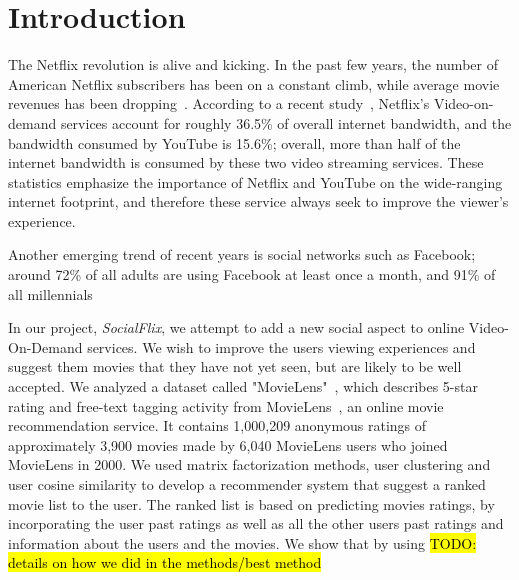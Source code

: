 \section{Introduction}
\label{sec:intro}

The Netflix revolution is alive and kicking. 
In the past few years, the number of American Netflix subscribers has been on a constant climb, while average movie revenues has been dropping~\cite{MisixNetflix}.
According to a recent study~\cite{VarietyNetflixBandwidth}, Netflix's Video-on-demand services account for roughly 36.5\% of overall internet bandwidth, and the bandwidth consumed by YouTube is 15.6\%; overall, more than half of the internet bandwidth is consumed by these two video streaming services.
These statistics emphasize the importance of Netflix and YouTube on the wide-ranging internet footprint, and therefore these service always seek to improve the viewer's experience.

Another emerging trend of recent years is social networks such as Facebook; around 72\% of all adults are using Facebook at least once a month, and 91\% of all millennials~\cite{FacebookStats}

In our project, \textit{SocialFlix}, we attempt to add a new social aspect to online Video-On-Demand services. We wish to improve the users viewing experiences and suggest them movies that they have not yet seen, but are likely to be well accepted. We analyzed a dataset called "MovieLens"~\cite{GroupLens}, which describes 5-star rating and free-text tagging activity from MovieLens~\cite{MovieLens}, an online movie recommendation service. It contains 1,000,209 anonymous ratings of approximately 3,900 movies made by 6,040 MovieLens users who joined MovieLens in 2000. We used matrix factorization methods, user clustering and user cosine similarity to develop a recommender system that suggest a ranked movie list to the user. The ranked list is based on predicting movies ratings, by incorporating the user past ratings as well as all the other users past ratings and information about the users and the movies. We show that by using \hl{TODO: details on how we did in the methods/best method}

